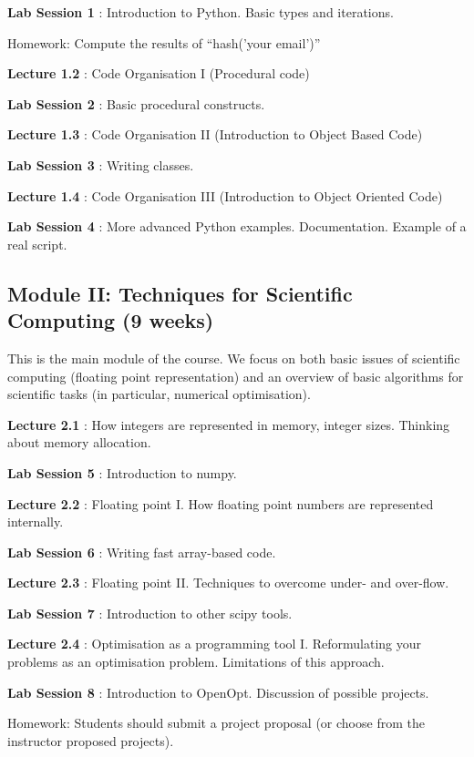 \documentclass{article}
\newcommand*{\Lecture}[1]{%
{\bf #1}%
}
\begin{document}
\Lecture{Lab Session 1}: Introduction to Python. Basic types and iterations.

Homework: Compute the results of ``hash('your email')'' %

\Lecture{Lecture 1.2}: Code Organisation I (Procedural code)

\Lecture{Lab Session 2}: Basic procedural constructs.

\Lecture{Lecture 1.3}: Code Organisation II (Introduction to Object Based Code)

\Lecture{Lab Session 3}: Writing classes.

\Lecture{Lecture 1.4}: Code Organisation III (Introduction to Object Oriented Code)

\Lecture{Lab Session 4}: More advanced Python examples. Documentation. Example of a real script.

\subsection{Module II: Techniques for Scientific Computing (9 weeks)}

This is the main module of the course. We focus on both basic issues of scientific computing (floating point representation) and an overview of basic algorithms for scientific tasks (in particular, numerical optimisation).

\Lecture{Lecture 2.1}: How integers are represented in memory, integer sizes. Thinking about memory allocation.

\Lecture{Lab Session 5}: Introduction to numpy.

\Lecture{Lecture 2.2}:  Floating point I. How floating point numbers are represented internally.

\Lecture{Lab Session 6}: Writing fast array-based code.

\Lecture{Lecture 2.3}: Floating point II. Techniques to overcome under- and over-flow.

\Lecture{Lab Session 7}: Introduction to other scipy tools.

\Lecture{Lecture 2.4}: Optimisation as a programming tool I. Reformulating your problems as an optimisation problem. Limitations of this approach.

\Lecture{Lab Session 8}: Introduction to OpenOpt. Discussion of possible projects.

Homework: Students should submit a project proposal (or choose from the instructor proposed projects).
\end{document}
